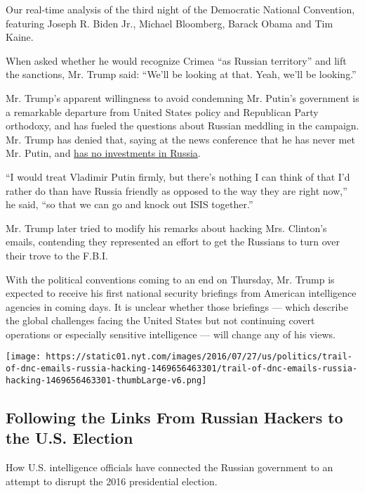 Our real-time analysis of the third night of the Democratic National
Convention, featuring Joseph R. Biden Jr., Michael Bloomberg, Barack
Obama and Tim Kaine.

When asked whether he would recognize Crimea ``as Russian territory''
and lift the sanctions, Mr. Trump said: ``We'll be looking at that.
Yeah, we'll be looking.''

Mr. Trump's apparent willingness to avoid condemning Mr. Putin's
government is a remarkable departure from United States policy and
Republican Party orthodoxy, and has fueled the questions about Russian
meddling in the campaign. Mr. Trump has denied that, saying at the news
conference that he has never met Mr. Putin, and
\href{https://twitter.com/realDonaldTrump/status/758071952498159616}{has
no investments in Russia}.

``I would treat Vladimir Putin firmly, but there's nothing I can think
of that I'd rather do than have Russia friendly as opposed to the way
they are right now,'' he said, ``so that we can go and knock out ISIS
together.''

Mr. Trump later tried to modify his remarks about hacking Mrs. Clinton's
emails, contending they represented an effort to get the Russians to
turn over their trove to the F.B.I.

With the political conventions coming to an end on Thursday, Mr. Trump
is expected to receive his first national security briefings from
American intelligence agencies in coming days. It is unclear whether
those briefings --- which describe the global challenges facing the
United States but not continuing covert operations or especially
sensitive intelligence --- will change any of his views.

\href{https://www.nytimes.com/interactive/2016/07/27/us/politics/trail-of-dnc-emails-russia-hacking.html}{}

\texttt{[image: https://static01.nyt.com/images/2016/07/27/us/politics/trail-of-dnc-emails-russia-hacking-1469656463301/trail-of-dnc-emails-russia-hacking-1469656463301-thumbLarge-v6.png]}

\hypertarget{following-the-links-from-russian-hackers-to-the-us-election}{%
\subsection{Following the Links From Russian Hackers to the U.S.
Election}\label{following-the-links-from-russian-hackers-to-the-us-election}}

How U.S. intelligence officials have connected the Russian government to
an attempt to disrupt the 2016 presidential election.

